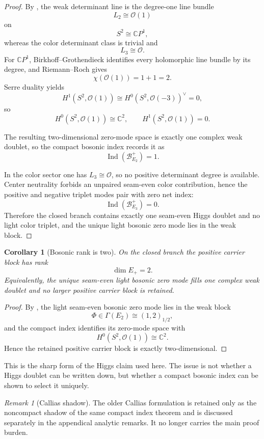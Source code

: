 \documentclass[11pt,a4paper]{article}
\newtheorem{corollary}[theorem]{Corollary}
\theoremstyle{definition}
\theoremstyle{remark}
\newtheorem*{remark}{Remark}
\DeclareMathOperator{\Ind}{Ind}
\begin{document}
\begin{proof}
By , the weak determinant line is the degree-one line
bundle
\[
L_2\cong\mathcal O(1)
\]
on
\[
S^2\cong\mathbb CP^1,
\]
whereas the color determinant class is trivial and
\[
L_3\cong\mathcal O.
\]
For $\mathbb CP^1$, Birkhoff--Grothendieck identifies every holomorphic line bundle by its degree,
and Riemann--Roch gives
\[
\chi(\mathcal O(1))=1+1=2.
\]
Serre duality yields
\[
H^1(S^2,\mathcal O(1))
\cong
H^0(S^2,\mathcal O(-3))^\vee
=0,
\]
so
\[
H^0(S^2,\mathcal O(1))\cong\mathbb C^2,
\qquad
H^1(S^2,\mathcal O(1))=0.
\]

The resulting two-dimensional zero-mode space is exactly one complex weak doublet, so the compact
bosonic index records it as
\[
\Ind(\mathcal B_{E_2}^+)=1.
\]

In the color sector one has $L_3\cong\mathcal O$, so no positive determinant degree is available.
Center neutrality forbids an unpaired seam-even color contribution, hence the positive and negative
triplet modes pair with zero net index:
\[
\Ind(\mathcal B_{E_3}^+)=0.
\]
Therefore the closed branch contains exactly one seam-even Higgs doublet and no light color
triplet, and the unique light bosonic zero mode lies in the weak block.
\end{proof}

\begin{corollary}[Bosonic rank is two]
\label{cor:bosonic-rank-two}
On the closed branch the positive carrier block has rank
\[
\dim E_+=2.
\]
Equivalently, the unique seam-even light bosonic zero mode fills one complex weak doublet and no
larger positive carrier block is retained.
\end{corollary}

\begin{proof}
By , the light seam-even bosonic zero mode lies in the weak block
\[
\Phi\in\Gamma(E_2)\cong (1,2)_{1/2},
\]
and the compact index identifies its zero-mode space with
\[
H^0(S^2,\mathcal O(1))\cong\mathbb C^2.
\]
Hence the retained positive carrier block is exactly two-dimensional.
\end{proof}

This is the sharp form of the Higgs claim used here. The issue is not whether a Higgs doublet can
be written down, but whether a compact bosonic index can be shown to select it uniquely.
\begin{remark}[Callias shadow]
The older Callias formulation is retained only as the noncompact shadow of the same compact index
theorem and is discussed separately in the appendical analytic remarks. It no longer carries the
main proof burden.
\end{remark}
\end{document}
